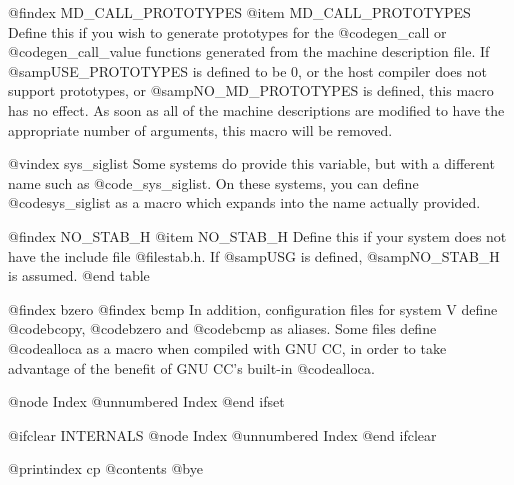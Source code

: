 @findex MD_CALL_PROTOTYPES
@item MD_CALL_PROTOTYPES
Define this if you wish to generate prototypes for the
@code{gen_call} or @code{gen_call_value} functions generated from
the machine description file.  If @samp{USE_PROTOTYPES} is
defined to be 0, or the host compiler does not support
prototypes, or @samp{NO_MD_PROTOTYPES} is defined, this macro has
no effect.  As soon as all of the machine descriptions are
modified to have the appropriate number of arguments, this macro
will be removed.

@vindex sys_siglist
Some systems do provide this variable, but with a different name such
as @code{_sys_siglist}.  On these systems, you can define
@code{sys_siglist} as a macro which expands into the name actually
provided.

@findex NO_STAB_H
@item NO_STAB_H
Define this if your system does not have the include file
@file{stab.h}.  If @samp{USG} is defined, @samp{NO_STAB_H} is
assumed.
@end table

@findex bzero
@findex bcmp
In addition, configuration files for system V define @code{bcopy},
@code{bzero} and @code{bcmp} as aliases.  Some files define @code{alloca}
as a macro when compiled with GNU CC, in order to take advantage of the
benefit of GNU CC's built-in @code{alloca}.


@node Index
@unnumbered Index
@end ifset

@ifclear INTERNALS
@node Index
@unnumbered Index
@end ifclear

@printindex cp
@contents
@bye
